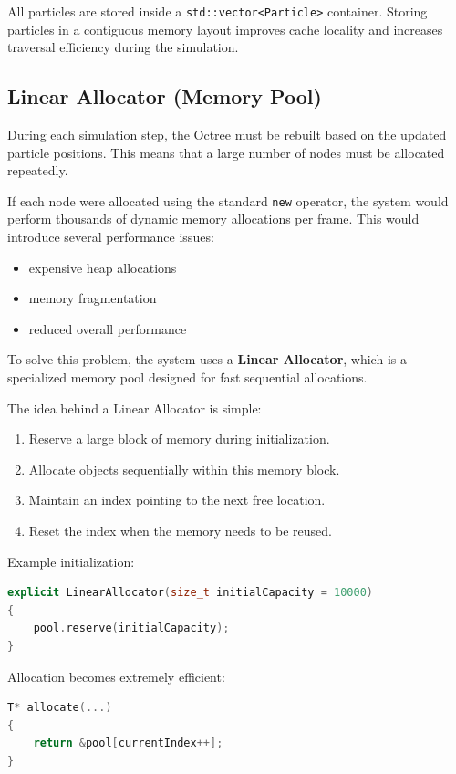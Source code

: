 All particles are stored inside a \texttt{std::vector<Particle>} container. Storing particles in a contiguous memory layout improves cache locality and increases traversal efficiency during the simulation.

\subsection{Linear Allocator (Memory Pool)}

During each simulation step, the Octree must be rebuilt based on the updated particle positions. This means that a large number of nodes must be allocated repeatedly.

If each node were allocated using the standard \texttt{new} operator, the system would perform thousands of dynamic memory allocations per frame. This would introduce several performance issues:

\begin{itemize}
\item expensive heap allocations
\item memory fragmentation
\item reduced overall performance
\end{itemize}

To solve this problem, the system uses a \textbf{Linear Allocator}, which is a specialized memory pool designed for fast sequential allocations.

The idea behind a Linear Allocator is simple:

\begin{enumerate}
\item Reserve a large block of memory during initialization.
\item Allocate objects sequentially within this memory block.
\item Maintain an index pointing to the next free location.
\item Reset the index when the memory needs to be reused.
\end{enumerate}

Example initialization:

\begin{lstlisting}[language=C++]
explicit LinearAllocator(size_t initialCapacity = 10000)
{
    pool.reserve(initialCapacity);
}
\end{lstlisting}

Allocation becomes extremely efficient:

\begin{lstlisting}[language=C++]
T* allocate(...)
{
    return &pool[currentIndex++];
}
\end{lstlisting}

